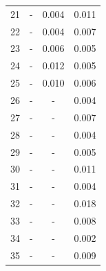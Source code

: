 \begin{longtable}{cccc}
    21 & -     & 0.004 & 0.011 \\
    22 & -     & 0.004 & 0.007 \\
    23 & -     & 0.006 & 0.005 \\
    24 & -     & 0.012 & 0.005 \\
    25 & -     & 0.010 & 0.006 \\
    26 & -     & -     & 0.004 \\
    27 & -     & -     & 0.007 \\
    28 & -     & -     & 0.004 \\
    29 & -     & -     & 0.005 \\
    30 & -     & -     & 0.011 \\
    31 & -     & -     & 0.004 \\
    32 & -     & -     & 0.018 \\
    33 & -     & -     & 0.008 \\
    34 & -     & -     & 0.002 \\
    35 & -     & -     & 0.009 \\
\end{longtable}

